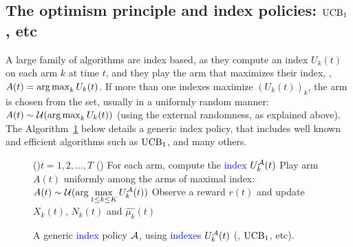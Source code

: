 \subsection{The optimism principle and index policies: $\UCB_1$, \klUCB{} etc}
\label{sub:2:IndexPolicies}

A large family of algorithms are index based, as they compute an index $U_k(t)$ on each arm $k$ at time $t$,
and they play the arm that maximizes their index, \ie, $A(t) = \operatorname*{arg\,max}_k U_k(t)$.
If more than one indexes maximize $(U_k(t))_k$, the arm is chosen from the set, usually in a uniformly random manner: $A(t) \sim \mathcal{U}(\operatorname*{arg\,max}_k U_k(t))$ (using the external randomness, as explained above).
%
The Algorithm~\ref{algo:2:indexPolicy} below details a generic index policy, that includes well known and efficient algorithms such as $\UCB_1$, \klUCB{} and many others.

\begin{figure}[h!]
	\centering
    \begin{framed}
	\begin{algorithm}[H]
		\For(){$t = 1, 2, \dots, T$}{
			\uElse(){
                For each arm, compute the \textcolor{blue}{index $U_k^{\mathcal{A}}(t)$}\;
                Play arm $A(t)$ uniformly among the arms of maximal index: \textcolor{blue}{$A(t) \sim \mathcal{U}(\arg\max\limits_{1\leq k \leq K} U_k^{\mathcal{A}}(t))$}\;
            }
            Observe a reward $r(t)$ and update $X_k(t)$, $N_k(t)$ and $\widehat{\mu_k}(t)$\;
		}
		\caption[{A generic index policy $\cA$, using indexes $U_k(t)$ (\eg, $\UCB_1$, \klUCB{} etc).}]{A generic \textcolor{blue}{index} policy $\cA$, using \textcolor{blue}{indexes $U_k^{\mathcal{A}}(t)$} (\eg, $\UCB_1$, \klUCB{} etc).}
		\label{algo:2:indexPolicy}
	\end{algorithm}
	\end{framed}
\end{figure}



